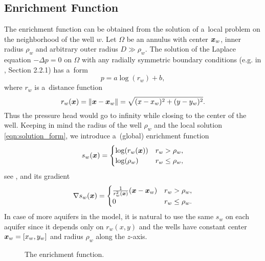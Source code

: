 \subsection{Enrichment Function}
\label{sec:enrichment_func}
The enrichment function can be obtained from the solution of a~local problem on the neighborhood of the well $w$.
Let $\Omega$ be an annulus with center $\mathbf{\boldsymbol{x}}_w$, inner radius $\rho_w$ and arbitrary outer radius $D \gg \rho_w$.
The solution of the Laplace equation $-\Delta p = 0$ on $\Omega$ with any radially symmetric boundary conditions
(e.g. in \cite{evans_partial_2010}, Section 2.2.1) has a~form
%
\begin{equation} \label{eqn:solution_form}
  p = a \log(r_w)+b, %
\end{equation}
where $r_w$ is a~distance function
\begin{equation} \label{eqn:distance}
r_w(\mathbf{\boldsymbol{x}}) = \|\mathbf{\boldsymbol{x}} - \mathbf{\boldsymbol{x}}_w\|= \sqrt{(x-x_w)^2+(y-y_w)^2}.
\end{equation}
%
Thus the pressure head would go to infinity while closing to the center of the well.
Keeping in mind the radius of the well $\rho_w$ and the local solution \eqref{eqn:solution_form}, 
we introduce a~(global) enrichment function
%
\begin{equation}
\label{eqn:enrich_func}
s_w(\mathbf{\boldsymbol{x}}) = 
  \begin{cases}
  \log(r_w(\mathbf{\boldsymbol{x}})) & r_w > \rho_w,\\
  \log(\rho_w) & r_w \le \rho_w,\\
  \end{cases}
\end{equation}
see , and its gradient
\begin{equation} \label{eqn:enrich_grad}
\nabla s_w(\mathbf{\boldsymbol{x}}) = 
  \begin{cases}  
    \frac{1}{r_w^2(\mathbf{\boldsymbol{x}})}(\mathbf{\boldsymbol{x}} - \mathbf{\boldsymbol{x}}_w) & r_w > \rho_w, \\
    0 & r_w \leq \rho_w.
  \end{cases}
\end{equation}
In case of more aquifers in the model, it is natural to use the same $s_w$ on each aquifer 
since it depends only on $r_w(x,y)$ and the wells have constant center $\mathbf{\boldsymbol{x}}_w=[x_w, y_w]$ and radius $\rho_w$ along the $z$-axis.

\begin{figure}[!htb]
  \begin{center}         
    \def\svgwidth{0.5\textwidth}
    
  \end{center}
  \caption{The enrichment function.}
  \label{fig:enrich_func}
\end{figure}


